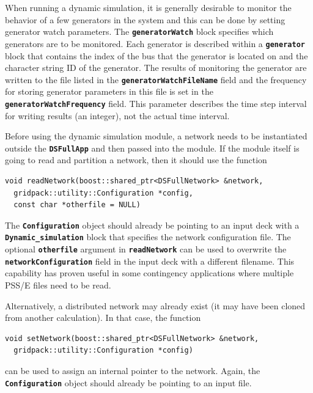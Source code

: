\documentclass[12pt]{report} %
\begin{document}
When running a dynamic simulation, it is generally desirable to monitor the behavior of a few generators in the system and this can be done by setting generator watch parameters. The \texttt{\textbf{generatorWatch}} block specifies which generators are to be monitored. Each generator is described within a \texttt{\textbf{generator}} block that contains the index of the bus that the generator is located on and the character string ID of the generator. The results of monitoring the generator are written to the file listed in the \texttt{\textbf{generatorWatchFileName}} field and the frequency for storing generator parameters in this file is set in the \texttt{\textbf{generatorWatchFrequency}} field. This parameter describes the time step interval for writing results (an integer), not the actual time interval.

Before using the dynamic simulation module, a network needs to be instantiated outside the \texttt{\textbf{DSFullApp}} and then passed into the module. If the module itself is going to read and partition a network, then it should use the function

{
\color{red}
\begin{Verbatim}[fontseries=b]
void readNetwork(boost::shared_ptr<DSFullNetwork> &network,
  gridpack::utility::Configuration *config,
  const char *otherfile = NULL)
\end{Verbatim}
}

The \texttt{\textbf{Configuration}} object should already be pointing to an input deck with a \texttt{\textbf{Dynamic\_simulation}} block that specifies the network configuration file. The optional \texttt{\textbf{otherfile}} argument in \texttt{\textbf{readNetwork}} can be used to overwrite the \texttt{\textbf{networkConfiguration}} field in the input deck with a different filename. This capability has proven useful in some contingency applications where multiple PSS/E files need to be read.

Alternatively, a distributed network may already exist (it may have been cloned from another calculation). In that case, the function

{
\color{red}
\begin{Verbatim}[fontseries=b]
void setNetwork(boost::shared_ptr<DSFullNetwork> &network,
  gridpack::utility::Configuration *config)
\end{Verbatim}
}

can be used to assign an internal pointer to the network. Again, the \texttt{\textbf{Configuration}} object should already be pointing to an input file.
\end{document}
